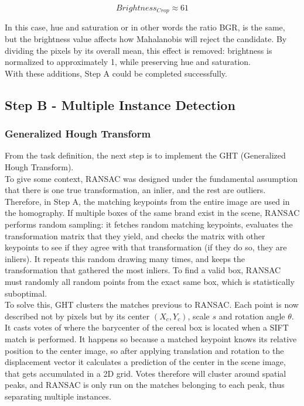 \documentclass[12pt]{article}
\begin{document}
\begin{equation}
Brightness_{Crop} \approx 61
\end{equation}


In this case, hue and saturation or in other words the ratio BGR, is the same, but the brightness value affects how Mahalanobis will reject the candidate. By dividing the pixels by its overall mean, this effect is removed: brightness is normalized to approximately 1, while preserving hue and saturation.\\


With these additions, Step A could be completed successfully.

\subsection{Step B - Multiple Instance Detection}

\subsubsection{Generalized Hough Transform}

From the task definition, the next step is to implement the GHT (Generalized Hough Transform).\\

To give some context, RANSAC was designed under the fundamental assumption that there is one true transformation, an inlier, and the rest are outliers.\\

Therefore, in Step A, the matching keypoints from the entire image are used in the homography. If multiple boxes of the same brand exist in the scene, RANSAC performs random sampling: it fetches random matching keypoints, evaluates the transformation matrix that they yield, and checks the matrix with other keypoints to see if they agree with that transformation (if they do so, they are inliers). It repeats this random drawing many times, and keeps the transformation that gathered the most inliers. To find a valid box, RANSAC must randomly  all random points from the exact same box, which is statistically suboptimal.\\

To solve this, GHT clusters the matches previous to RANSAC. Each point is now described not by pixels but by its center $(X_c, Y_c)$, scale $s$ and rotation angle $\theta$. It casts votes of where the barycenter of the cereal box is located when a SIFT match is performed. It happens so because a matched keypoint knows its relative position to the center image, so after applying translation and rotation to the displacement vector it calculates a prediction of the center in the scene image, that gets accumulated in a 2D grid. Votes therefore will cluster around spatial peaks, and RANSAC is only run on the matches belonging to each peak, thus separating multiple instances.



\newpage
\ \thispagestyle{empty}
\end{document}

